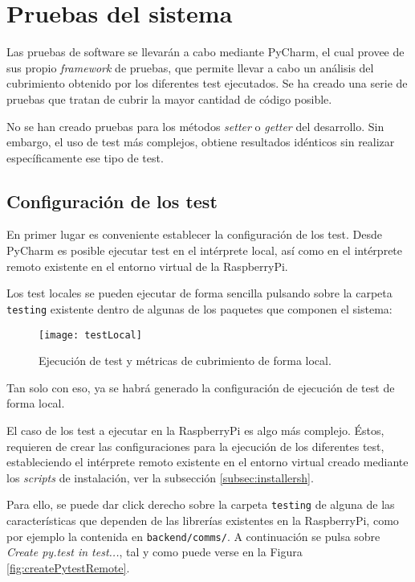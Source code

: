 \section{Pruebas del sistema}

Las pruebas de software se llevarán a cabo mediante PyCharm, el cual provee de sus propio \emph{framework} de pruebas, que permite llevar a cabo un análisis del cubrimiento obtenido por los diferentes test ejecutados. Se ha creado una serie de pruebas que tratan de cubrir la mayor cantidad de código posible. 

No se han creado pruebas para los métodos \emph{setter} o \emph{getter} del desarrollo. Sin embargo, el uso de test más complejos, obtiene resultados idénticos sin realizar específicamente ese tipo de test. 


\subsection{Configuración de los test}
\label{subsec:configtest}
En primer lugar es conveniente establecer la configuración de los test. Desde PyCharm es posible ejecutar test en el intérprete local, así como en el intérprete remoto existente en el entorno virtual de la RaspberryPi. 

Los test locales se pueden ejecutar de forma sencilla pulsando sobre la carpeta \texttt{testing} existente dentro de algunas de los paquetes que componen el sistema: 


\begin{figure}[H]
	\centering
	\texttt{[image: testLocal]}
	\caption[Ejecución de test en intérprete local]{Ejecución de test y métricas de cubrimiento de forma local.}\label{fig:testLocal}
\end{figure}

Tan solo con eso, ya se habrá generado la configuración de ejecución de test de forma local. 

El caso de los test a ejecutar en la RaspberryPi es algo más complejo. Éstos, requieren de crear las configuraciones para la ejecución de los diferentes test, estableciendo el intérprete remoto existente en el entorno virtual creado mediante los \emph{scripts} de instalación, ver la subsección \ref{subsec:installersh}.

Para ello, se puede dar click derecho sobre la carpeta \texttt{testing} de alguna de las características que dependen de las librerías existentes en la RaspberryPi, como por ejemplo la contenida en \texttt{backend/comms/}. 
A continuación se pulsa sobre \emph{Create py.test in test...}, tal y como puede verse en la Figura \ref{fig:createPytestRemote}.

